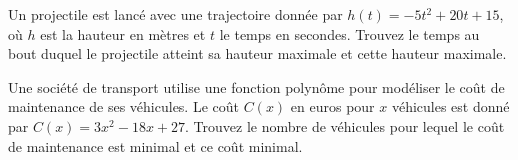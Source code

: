 \documentclass[11pt,a4paper]{article}  %
\begin{document}
\exercice{}

Un projectile est lancé avec une trajectoire donnée par \( h(t) = -5t^2 + 20t + 15 \), où \( h \) est la hauteur en mètres et \( t \) le temps en secondes. Trouvez le temps au bout duquel le projectile atteint sa hauteur maximale et cette hauteur maximale.

%
%
%
%
%
%
%
%
%











Une société de transport utilise une fonction polynôme pour modéliser le coût de maintenance de ses véhicules. Le coût \( C(x) \) en euros pour \( x \) véhicules est donné par \( C(x) = 3x^2 - 18x + 27 \). Trouvez le nombre de véhicules pour lequel le coût de maintenance est minimal et ce coût minimal.
\end{document}
